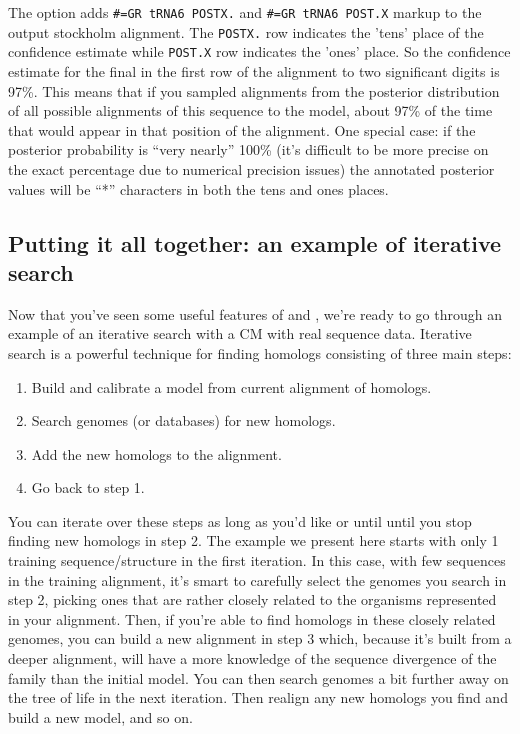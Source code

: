 The  option adds {\small\verb+#=GR tRNA6 POSTX.+} and
{\small\verb+#=GR tRNA6 POST.X+} markup to the output stockholm
alignment. The {\small\verb+POSTX.+} row indicates the 'tens' place of
the confidence estimate while {\small\verb+POST.X+} row indicates the
'ones' place. So the confidence estimate for the final  in the
first row of the alignment to two significant digits is 97\%. This
means that if you sampled alignments from the posterior distribution
of all possible alignments of this sequence to the model, about 97\%
of the time that  would appear in that position of the
alignment. One special case: if the posterior probability is ``very
nearly'' 100\% (it's difficult to be more precise on the exact
percentage due to numerical precision issues) the annotated posterior
values will be ``*'' characters in both the tens and ones places.

\newpage
\subsection{Putting it all together: an example of iterative search}

Now that you've seen some useful features of  and
, we're ready to go through an example of an iterative
search with a CM with real sequence data. Iterative search is a powerful
technique for finding homologs consisting of three main steps:
\begin{enumerate}
\item
  Build and calibrate a model from current alignment of homologs.
\item 
  Search genomes (or databases) for new homologs.
\item
  Add the new homologs to the alignment.
\item
  Go back to step 1.
\end{enumerate}

You can iterate over these steps as long as you'd like or until
until you stop finding new homologs in step 2.  The example we present
here starts with only 1 training sequence/structure in the first
iteration. In this case, with few sequences in the training alignment,
it's smart to carefully select the genomes you search in step 2,
picking ones that are rather closely related to the organisms
represented in your alignment. Then, if you're able to find homologs
in these closely related genomes, you can build a new alignment
in step 3 which, because it's built from a deeper alignment, will have
a more knowledge of the sequence divergence of the family than
the initial model. You can then search genomes a bit further away on
the tree of life in the next iteration. Then realign any new homologs
you find and build a new model, and so on. 

